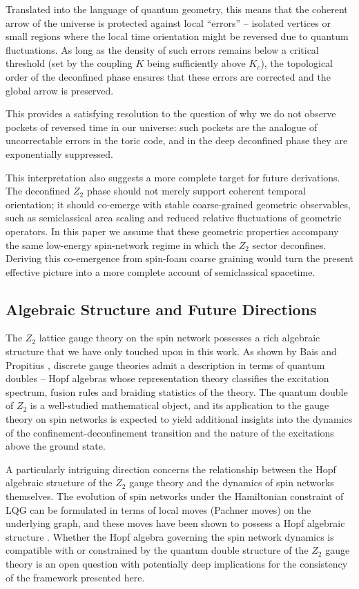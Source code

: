\documentclass[preprint]{SciPost}
\theoremstyle{plain} %
\begin{document}
Translated into the language of quantum geometry, this means that the coherent arrow of the universe is protected against local ``errors'' -- isolated vertices or small regions where the local time orientation might be reversed due to quantum fluctuations. As long as the density of such errors remains below a critical threshold (set by the coupling $ K $ being sufficiently above $ K_c $), the topological order of the deconfined phase ensures that these errors are corrected and the global arrow is preserved.

This provides a satisfying resolution to the question of why we do not observe pockets of reversed time in our universe: such pockets are the analogue of uncorrectable errors in the toric code, and in the deep deconfined phase they are exponentially suppressed.

This interpretation also suggests a more complete target for future derivations. The deconfined $Z_2$ phase should not merely support coherent temporal orientation; it should co-emerge with stable coarse-grained geometric observables, such as semiclassical area scaling and reduced relative fluctuations of geometric operators. In this paper we assume that these geometric properties accompany the same low-energy spin-network regime in which the $Z_2$ sector deconfines. Deriving this co-emergence from spin-foam coarse graining would turn the present effective picture into a more complete account of semiclassical spacetime.

\subsection{Algebraic Structure and Future Directions}

The $ Z_2 $ lattice gauge theory on the spin network possesses a rich algebraic structure that we have only touched upon in this work. As shown by Bais and Propitius \cite{Propitius1996Discrete}, discrete gauge theories admit a description in terms of quantum doubles -- Hopf algebras whose representation theory classifies the excitation spectrum, fusion rules and braiding statistics of the theory. The quantum double of $ Z_2 $ is a well-studied mathematical object, and its application to the gauge theory on spin networks is expected to yield additional insights into the dynamics of the confinement-deconfinement transition and the nature of the excitations above the ground state.

A particularly intriguing direction concerns the relationship between the Hopf algebraic structure of the $ Z_2 $ gauge theory and the dynamics of spin networks themselves. The evolution of spin networks under the Hamiltonian constraint of LQG can be formulated in terms of local moves (Pachner moves) on the underlying graph, and these moves have been shown to possess a Hopf algebraic structure \cite{Markopoulou1997Dual,Markopoulou2000Quantum}. Whether the Hopf algebra governing the spin network dynamics is compatible with or constrained by the quantum double structure of the $ Z_2 $ gauge theory is an open question with potentially deep implications for the consistency of the framework presented here.
\end{document}
